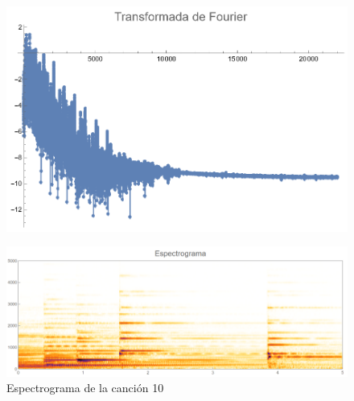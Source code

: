 \documentclass[12pt, letterpaper]{article}
\begin{document}
\begin{figure}[H]
  \centering
  \begin{minipage}{.4\linewidth}
    \centering
    \includegraphics[width=\linewidth]{imgs/Cancion10/transformada.png}
    \label{fig:010a}
  \end{minipage}
  \begin{minipage}{0.07\textwidth}\end{minipage}
  \begin{minipage}{.47\linewidth}
    \centering
    \includegraphics[width=\linewidth]{imgs/Cancion10/espectrograma.png}
    \caption{Espectrograma de la canción 10}
    \label{fig:010i}
  \end{minipage}
\end{figure}
\end{document}

